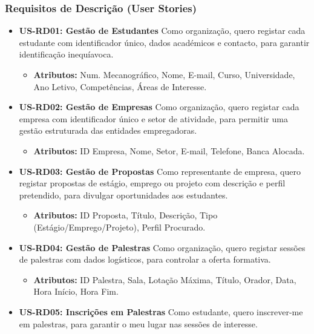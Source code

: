 \documentclass[12pt,a4paper]{article}
\begin{document}
\subsubsection{Requisitos de Descrição (User Stories)}

\begin{itemize}[leftmargin=1.5cm]
    \item \textbf{US-RD01: Gestão de Estudantes} Como organização, quero registar cada
    estudante com identificador único, dados académicos e contacto, para
    garantir identificação inequíavoca.
    \begin{itemize}[leftmargin=1.2cm]
        \item \textbf{Atributos:} Num. Mecanográfico, Nome, E-mail, Curso, Universidade, Ano Letivo, Competências, Áreas de Interesse.
    \end{itemize}
    \item \textbf{US-RD02: Gestão de Empresas} Como organização, quero registar cada
    empresa com identificador único e setor de atividade, para permitir uma
    gestão estruturada das entidades empregadoras.
    \begin{itemize}[leftmargin=1.2cm]
        \item \textbf{Atributos:} ID Empresa, Nome, Setor, E-mail, Telefone, Banca Alocada.
    \end{itemize}
    \item \textbf{US-RD03: Gestão de Propostas} Como representante de empresa, quero registar
    propostas de estágio, emprego ou projeto com descrição e perfil pretendido,
    para divulgar oportunidades aos estudantes.
    \begin{itemize}[leftmargin=1.2cm]
        \item \textbf{Atributos:} ID Proposta, Título, Descrição, Tipo (Estágio/Emprego/Projeto), Perfil Procurado.
    \end{itemize}
    \item \textbf{US-RD04: Gestão de Palestras} Como organização, quero registar sessões de palestras com dados logísticos, para controlar a oferta formativa.
    \begin{itemize}[leftmargin=1.2cm]
        \item \textbf{Atributos:} ID Palestra, Sala, Lotação Máxima, Título, Orador, Data, Hora Início, Hora Fim.
    \end{itemize}
    \item \textbf{US-RD05: Inscrições em Palestras} Como estudante, quero inscrever-me em palestras, para garantir o meu lugar nas sessões de interesse.

\end{itemize}
\end{document}
